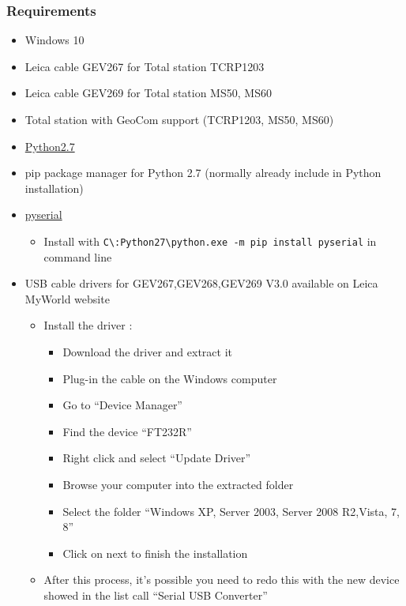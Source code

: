 \hypertarget{requirements}{%
\subsubsection{Requirements}\label{requirements}}

\begin{itemize}
\tightlist
\item
  Windows 10
\item
  Leica cable GEV267 for Total station TCRP1203
\item
  Leica cable GEV269 for Total station MS50, MS60
\item
  Total station with GeoCom support (TCRP1203, MS50, MS60)
\item
  \href{https://www.python.org/download/releases/2.7/}{Python2.7}
\item
  pip package manager for Python 2.7 (normally already include in Python
  installation)
\item
  \href{https://pypi.python.org/pypi/pyserial/2.7}{pyserial}

  \begin{itemize}
  \tightlist
  \item
    Install with
    \texttt{C\textbackslash{}:Python27\textbackslash{}python.exe\ -m\ pip\ install\ pyserial}
    in command line
  \end{itemize}
\item
  USB cable drivers for GEV267,GEV268,GEV269 V3.0 available on Leica
  MyWorld website

  \begin{itemize}
  \tightlist
  \item
    Install the driver :

    \begin{itemize}
    \tightlist
    \item
      Download the driver and extract it
    \item
      Plug-in the cable on the Windows computer
    \item
      Go to ``Device Manager''
    \item
      Find the device ``FT232R''
    \item
      Right click and select ``Update Driver''
    \item
      Browse your computer into the extracted folder
    \item
      Select the folder ``Windows XP, Server 2003, Server 2008 R2,Vista,
      7, 8''
    \item
      Click on next to finish the installation
    \end{itemize}
  \item
    After this process, it's possible you need to redo this with the new
    device showed in the list call ``Serial USB Converter''
  \end{itemize}
\end{itemize}


